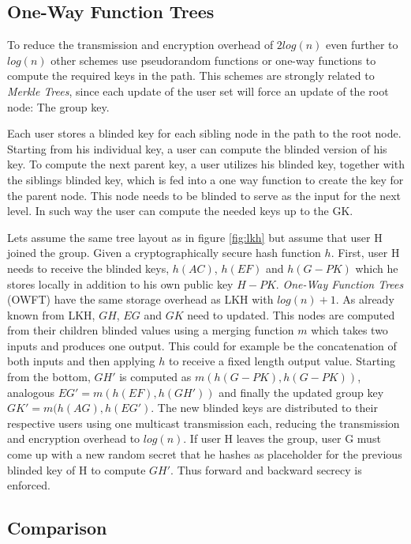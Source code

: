 \subsection{One-Way Function Trees}
To reduce the transmission and encryption overhead of $2 log(n)$ even further to $log(n)$ other schemes use pseudorandom functions \cite{canetti1999multicast} or one-way functions \cite{sherman2003key} to compute the required keys in the path. This schemes are strongly related to \textit{Merkle Trees}, since each update of the user set will force an update of the root node: The group key.

Each user stores a blinded key for each sibling node in the path to the root node. Starting from his individual key, a user can compute the blinded version of his key. To compute the next parent key, a user utilizes his blinded key, together with the siblings blinded key, which is fed into a one way function to create the key for the parent node. This node needs to be blinded to serve as the input for the next level. In such way the user can compute the needed keys up to the GK. 

Lets assume the same tree layout as in figure \ref{fig:lkh} but assume that user H joined the group. Given a cryptographically secure hash function $h$. First, user H needs to receive the blinded keys, $h(AC)$, $h(EF)$ and $h(G-PK)$ which he stores locally in addition to his own public key $H-PK$. \textit{One-Way Function Trees} (\ac{OWFT}) have the same storage overhead as LKH with $log(n) + 1$.  As already known from LKH, $GH$, $EG$ and $GK$ need to updated. This nodes are computed from their children blinded values using a merging function $m$ which takes two inputs and produces one output. This could for example be the concatenation of both inputs and then applying $h$ to receive a fixed length output value. Starting from the bottom,  $GH'$ is computed as $m(h(G-PK), h(G-PK))$, analogous $EG' = m(h(EF), h(GH'))$ and finally the updated group key $GK' = m(h(AG), h(EG')$. The new blinded keys are distributed to their respective users using one multicast transmission each, reducing the transmission and encryption overhead to $log(n)$. If user H leaves the group, user G must come up with a new random secret that he hashes as placeholder for the previous blinded key of H to compute $GH'$. Thus forward and backward secrecy is enforced.


\subsection{Comparison}  

